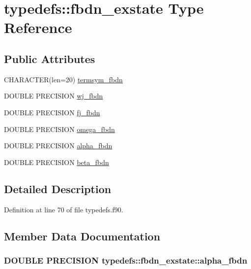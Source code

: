 \hypertarget{typetypedefs_1_1fbdn__exstate}{
\section{typedefs::fbdn\_\-exstate Type Reference}
\label{typetypedefs_1_1fbdn__exstate}
}
\subsection*{Public Attributes}
\begin{DoxyCompactItemize}
\item 
CHARACTER(len=20) \hyperlink{typetypedefs_1_1fbdn__exstate_a5d5aa9abbdf8366cd5bd2a88cb2d2cd2}{termsym\_\-fbdn}
\item 
DOUBLE PRECISION \hyperlink{typetypedefs_1_1fbdn__exstate_aaf62d1b6e41c831990923a8e0ca14373}{wj\_\-fbdn}
\item 
DOUBLE PRECISION \hyperlink{typetypedefs_1_1fbdn__exstate_a0acc4647581eff1d24ce1d71d3f73f8b}{fj\_\-fbdn}
\item 
DOUBLE PRECISION \hyperlink{typetypedefs_1_1fbdn__exstate_af1c6388e1f1f6455d2ee128b875f7adc}{omega\_\-fbdn}
\item 
DOUBLE PRECISION \hyperlink{typetypedefs_1_1fbdn__exstate_a2b6818045634ea0071217f07d9985e31}{alpha\_\-fbdn}
\item 
DOUBLE PRECISION \hyperlink{typetypedefs_1_1fbdn__exstate_a690aa05deb0d2ffba11f3ae2aaf0e9af}{beta\_\-fbdn}
\end{DoxyCompactItemize}


\subsection{Detailed Description}


Definition at line 70 of file typedefs.f90.

\subsection{Member Data Documentation}
\hypertarget{typetypedefs_1_1fbdn__exstate_a2b6818045634ea0071217f07d9985e31}{
\subsubsection[{alpha\_\-fbdn}]{\setlength{\rightskip}{0pt plus 5cm}DOUBLE PRECISION {\bf typedefs::fbdn\_\-exstate::alpha\_\-fbdn}}}
\label{typetypedefs_1_1fbdn__exstate_a2b6818045634ea0071217f07d9985e31}


